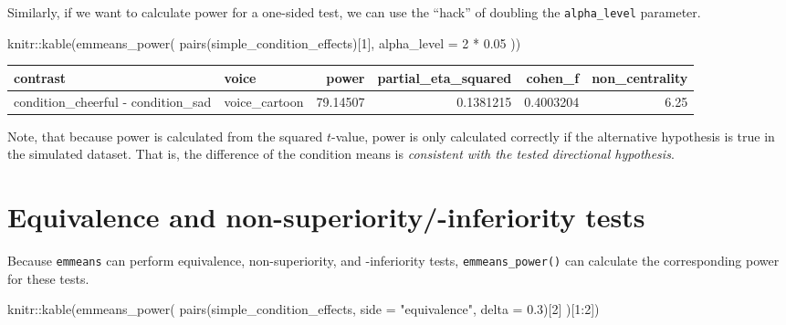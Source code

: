 \documentclass[
]{book}
\newenvironment{Shaded}{\begin{snugshade}}{\end{snugshade}}
\newcommand{\AttributeTok}[1]{\textcolor[rgb]{0.77,0.63,0.00}{#1}}
\newcommand{\DecValTok}[1]{\textcolor[rgb]{0.00,0.00,0.81}{#1}}
\newcommand{\FloatTok}[1]{\textcolor[rgb]{0.00,0.00,0.81}{#1}}
\newcommand{\FunctionTok}[1]{\textcolor[rgb]{0.00,0.00,0.00}{#1}}
\newcommand{\NormalTok}[1]{#1}
\newcommand{\SpecialCharTok}[1]{\textcolor[rgb]{0.00,0.00,0.00}{#1}}
\newcommand{\StringTok}[1]{\textcolor[rgb]{0.31,0.60,0.02}{#1}}
\begin{document}
Similarly, if we want to calculate power for a one-sided test, we can use the ``hack'' of doubling the \texttt{alpha\_level} parameter.

\begin{Shaded}
\begin{Highlighting}[]
\NormalTok{knitr}\SpecialCharTok{::}\FunctionTok{kable}\NormalTok{(}\FunctionTok{emmeans\_power}\NormalTok{(}
  \FunctionTok{pairs}\NormalTok{(simple\_condition\_effects)[}\DecValTok{1}\NormalTok{],}
  \AttributeTok{alpha\_level =} \DecValTok{2} \SpecialCharTok{*} \FloatTok{0.05}
\NormalTok{))}
\end{Highlighting}
\end{Shaded}

\begin{tabular}{l|l|r|r|r|r}
\hline
contrast & voice & power & partial\_eta\_squared & cohen\_f & non\_centrality\\
\hline
condition\_cheerful - condition\_sad & voice\_cartoon & 79.14507 & 0.1381215 & 0.4003204 & 6.25\\
\hline
\end{tabular}

Note, that because power is calculated from the squared \(t\)-value, power is only calculated correctly if the alternative hypothesis is true in the simulated dataset.
That is, the difference of the condition means is \emph{consistent with the tested directional hypothesis}.

\hypertarget{equivalence-and-non-superiority-inferiority-tests}{%
\section{Equivalence and non-superiority/-inferiority tests}\label{equivalence-and-non-superiority-inferiority-tests}}

Because \texttt{emmeans} can perform equivalence, non-superiority, and -inferiority tests, \texttt{emmeans\_power()} can calculate the corresponding power for these tests.

\begin{Shaded}
\begin{Highlighting}[]
\NormalTok{knitr}\SpecialCharTok{::}\FunctionTok{kable}\NormalTok{(}\FunctionTok{emmeans\_power}\NormalTok{(}
  \FunctionTok{pairs}\NormalTok{(simple\_condition\_effects, }\AttributeTok{side =} \StringTok{"equivalence"}\NormalTok{, }\AttributeTok{delta =} \FloatTok{0.3}\NormalTok{)[}\DecValTok{2}\NormalTok{]}
\NormalTok{)[}\DecValTok{1}\SpecialCharTok{:}\DecValTok{2}\NormalTok{])}
\end{Highlighting}
\end{Shaded}
\end{document}

